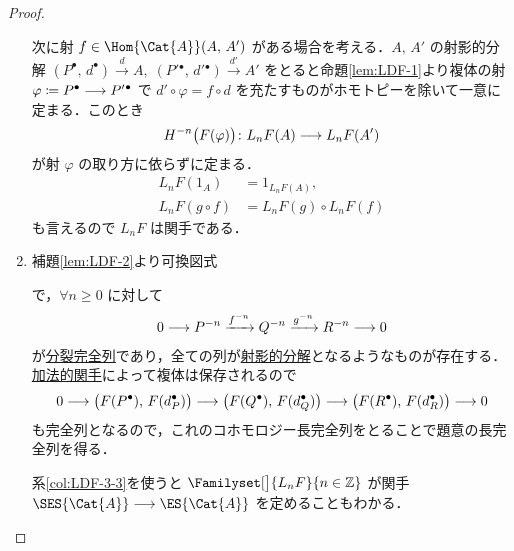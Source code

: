 \documentclass[algtopo_main]{subfiles}
\begin{document}
\begin{proof}
\begin{enumerate}
        次に射 $f \in \Hom{\Cat{A}}(A,\, A')$ がある場合を考える．$A,\, A'$ の射影的分解 $(P^\bullet,\, d^\bullet) \xrightarrow{d}A,\;(P'{}^\bullet,\, d'{}^\bullet) \xrightarrow{d'}A'$ をとると命題\ref{lem:LDF-1}より複体の射 $\varphi\coloneqq P^\bullet \longrightarrow P'{}^\bullet$ で $d' \circ \varphi = f \circ d$ を充たすものがホモトピーを除いて一意に定まる．このとき
        \begin{align}
            H^{-n} \bigl( F(\varphi) \bigr) \colon L_nF(A) \longrightarrow L_nF(A')
        \end{align}
        が射 $\varphi$ の取り方に依らずに定まる．
        \begin{align}
            L_nF(1_A) &= 1_{L_nF(A)}, \\
            L_nF(g \circ f) &= L_nF(g) \circ L_nF(f)
        \end{align}
        も言えるので $L_nF$ は関手である．
        \item 補題\ref{lem:LDF-2}より可換図式
        \begin{figure}[H]
            \centering
        \end{figure}%
        で，$\forall n \ge 0$ に対して
        \begin{align}
            0 \longrightarrow P^{-n} \xrightarrow{f^{-n}} Q^{-n} \xrightarrow{g^{-n}} R^{-n} \longrightarrow 0
        \end{align}
        が\hyperref[def:split]{分裂完全列}であり，全ての列が\hyperref[def:projective-resolution]{射影的分解}となるようなものが存在する．\hyperref[def:Ab-func]{加法的関手}によって複体は保存されるので
        \begin{align}
            0 \longrightarrow \bigl( F(P^\bullet),\, F(d_P^\bullet) \bigr) \longrightarrow \bigl( F(Q^\bullet),\, F(d_Q^\bullet) \bigr) \longrightarrow \bigl( F(R^\bullet),\, F(d_R^\bullet) \bigr) \longrightarrow 0 
        \end{align}
        も完全列となるので，これのコホモロジー長完全列をとることで題意の長完全列を得る．

        系\ref{col:LDF-3-3}を使うと $\Familyset[\big]{L_nF}{n\in \mathbb{Z}}$ が関手 $\SES{\Cat{A}} \lto \ES{\Cat{A}}$ を定めることもわかる．


\end{enumerate}
\end{proof}
\end{document}
